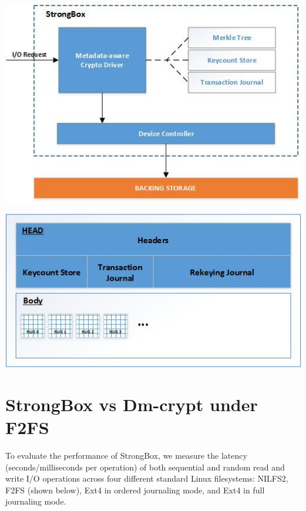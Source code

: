 \documentclass[a0,portrait]{a0poster}
\newcommand{\PAD}{\vskip 0.75cm}
\begin{document}
\begin{multicols}{2}
\begin{minipage}{0.6\columnwidth}
\PAD 
\centering
\includegraphics{overview}
\label{fig:overview}
\PAD 
\end{minipage}
\begin{minipage}{0.4\columnwidth}
\PAD 
\centering
\includegraphics{backstore}
\label{fig:backstore}
\PAD 
\end{minipage}


\section*{StrongBox vs Dm-crypt under F2FS}

To evaluate the performance of StrongBox, we measure the latency
(seconds/milliseconds per operation) of both sequential and random read and
write I/O operations across four different standard Linux filesystems: NILFS2,
F2FS (shown below), Ext4 in ordered journaling mode, and Ext4 in full journaling mode.


\end{multicols}
\end{document}
